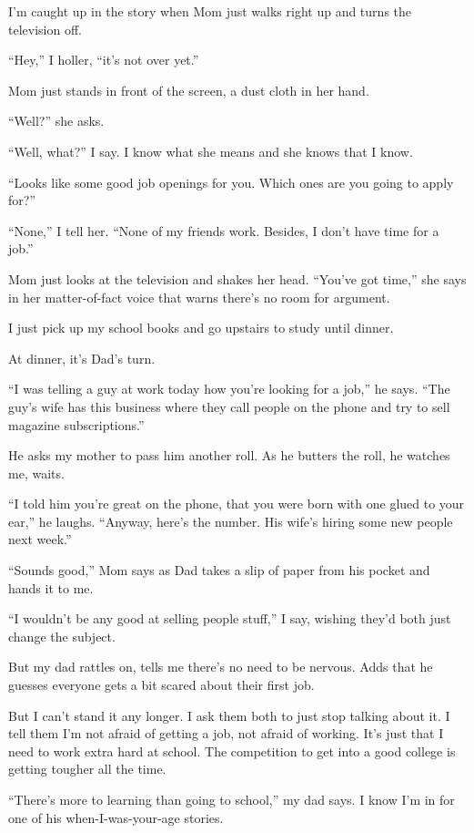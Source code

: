 \documentclass[twoside,10pt]{book}
\begin{document}
I'm caught up in the story when Mom just walks right up and turns the
television off.

``Hey,'' I holler, ``it's not over yet.''

Mom just stands in front of the screen, a dust cloth in her hand.

``Well?'' she asks.

``Well, what?'' I say. I know what she means and she knows that I know.

``Looks like some good job openings for you. Which ones are you going to
apply for?''

``None,'' I tell her. ``None of my friends work. Besides, I don't have
time for a job.''

Mom just looks at the television and shakes her head. ``You've got
time,'' she says in her matter-of-fact voice that warns there's no room
for argument.

I just pick up my school books and go upstairs to study until dinner.

At dinner, it's Dad's turn.

``I was telling a guy at work today how you're looking for a job,'' he
says. ``The guy's wife has this business where they call people on the
phone and try to sell magazine subscriptions.''

He asks my mother to pass him another roll. As he butters the roll, he
watches me, waits.

``I told him you're great on the phone, that you were born with one
glued to your ear,'' he laughs. ``Anyway, here's the number. His wife's
hiring some new people next week.''

``Sounds good,'' Mom says as Dad takes a slip of paper from his pocket
and hands it to me.

``I wouldn't be any good at selling people stuff,'' I say, wishing
they'd both just change the subject.

But my dad rattles on, tells me there's no need to be nervous. Adds that
he guesses everyone gets a bit scared about their first job.

But I can't stand it any longer. I ask them both to just stop talking
about it. I tell them I'm not afraid of getting a job, not afraid of
working. It's just that I need to work extra hard at school. The
competition to get into a good college is getting tougher all the time.

``There's more to learning than going to school,'' my dad says. I know
I'm in for one of his when-I-was-your-age stories.
\end{document}
